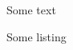 \documentclass{memoir}
\begin{document}
Some text
\begin{listing}
Some listing
\caption{Some caption}
\end{listing}
\end{document}
